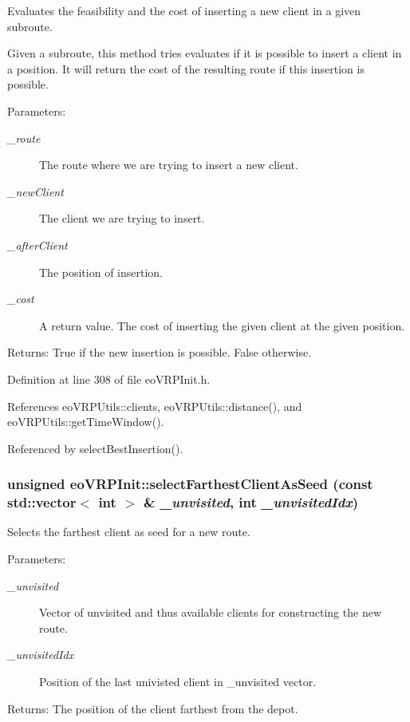 Evaluates the feasibility and the cost of inserting a new client in a given subroute. 

Given a subroute, this method tries evaluates if it is possible to insert a client in a position. It will return the cost of the resulting route if this insertion is possible. \begin{Desc}
\item[Parameters:]
\begin{description}
\item[{\em \_\-route}]The route where we are trying to insert a new client. \item[{\em \_\-new\-Client}]The client we are trying to insert. \item[{\em \_\-after\-Client}]The position of insertion. \item[{\em \_\-cost}]A return value. The cost of inserting the given client at the given position. \end{description}
\end{Desc}
\begin{Desc}
\item[Returns:]True if the new insertion is possible. False otherwise. \end{Desc}


Definition at line 308 of file eo\-VRPInit.h.

References eo\-VRPUtils::clients, eo\-VRPUtils::distance(), and eo\-VRPUtils::get\-Time\-Window().

Referenced by select\-Best\-Insertion().
\subsubsection{\setlength{\rightskip}{0pt plus 5cm}unsigned eo\-VRPInit::select\-Farthest\-Client\-As\-Seed (const std::vector$<$ int $>$ \& {\em \_\-unvisited}, int {\em \_\-unvisited\-Idx})\hspace{0.3cm}{\tt  [inline, private]}}\label{classeo_v_r_p_init_a24867d25a6c9911e9b5c9eb1b4b650d}


Selects the farthest client as seed for a new route. 

\begin{Desc}
\item[Parameters:]
\begin{description}
\item[{\em \_\-unvisited}]Vector of unvisited and thus available clients for constructing the new route. \item[{\em \_\-unvisited\-Idx}]Position of the last univisted client in \_\-unvisited vector. \end{description}
\end{Desc}
\begin{Desc}
\item[Returns:]The position of the client farthest from the depot. \end{Desc}



